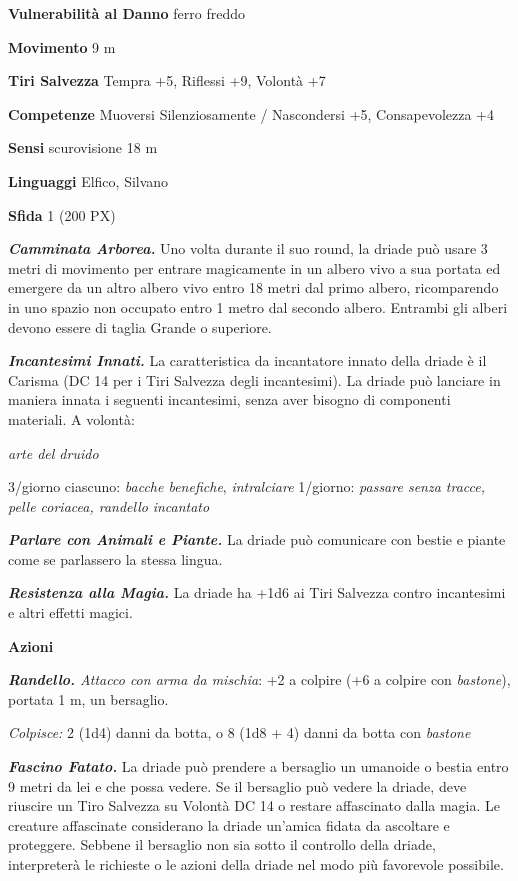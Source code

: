 \begin{multicols}{2}
	\textbf{Vulnerabilità al Danno} ferro freddo

	\textbf{Movimento} 9 m

	\textbf{Tiri Salvezza} Tempra +5, Riflessi +9, Volontà +7

	\textbf{Competenze} Muoversi Silenziosamente / Nascondersi +5, Consapevolezza +4

	\textbf{Sensi} scurovisione 18 m

	\textbf{Linguaggi} Elfico, Silvano

	\textbf{Sfida} 1 (200 PX)

	\textit{\textbf{Camminata Arborea.}} Uno volta durante il suo round, la driade può usare 3 metri di movimento per entrare magicamente in un albero vivo a sua portata ed emergere da un altro albero vivo entro 18 metri dal primo albero, ricomparendo in uno spazio non occupato entro 1 metro dal secondo albero. Entrambi gli alberi devono essere di taglia Grande o superiore.

	\textit{\textbf{Incantesimi Innati.}} La caratteristica da incantatore innato della driade è il Carisma (DC 14 per i Tiri Salvezza degli incantesimi). La driade può lanciare in maniera innata i seguenti incantesimi, senza aver bisogno di componenti materiali. A volontà:

	\textit{arte del druido}

	3/giorno ciascuno: \textit{bacche benefiche}, \textit{intralciare} 1/giorno:
	\textit{passare senza tracce, pelle coriacea, randello} \textit{incantato}

	\textit{\textbf{Parlare con Animali e Piante.}} La driade può comunicare con bestie e piante come se parlassero la stessa lingua.

	\textit{\textbf{Resistenza alla Magia.}} La driade ha +1d6 ai Tiri Salvezza contro incantesimi e altri effetti magici.

	\textbf{Azioni}

	\textit{\textbf{Randello.} Attacco con arma da mischia}: +2 a colpire (+6 a colpire con \textit{bastone}), portata 1 m, un bersaglio.

	\textit{Colpisce:} 2 (1d4) danni da botta, o 8 (1d8 + 4) danni da botta con \textit{bastone}

	\textit{\textbf{Fascino Fatato.}} La driade può prendere a bersaglio un umanoide o bestia entro 9 metri da lei e che possa vedere. Se il bersaglio può vedere la driade, deve riuscire un Tiro Salvezza su Volontà DC 14 o restare affascinato dalla magia. Le creature affascinate considerano la driade un'amica fidata da ascoltare e proteggere. Sebbene il bersaglio non sia sotto il controllo della driade, interpreterà le richieste o le azioni della driade nel modo più favorevole possibile.


\end{multicols}
